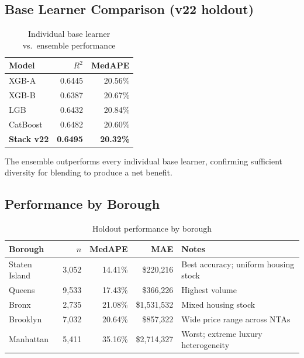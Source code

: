 \documentclass[11pt, a4paper, twoside]{article}
\begin{document}
\subsection{Base Learner Comparison (v22 holdout)}
\begin{table}[H]
  \centering
  \caption{Individual base learner vs.\ ensemble performance}
  \label{tab:base_perf}
  \begin{tabular}{lrr}
    \toprule
    Model & $R^2$ & MedAPE \\
    \midrule
    XGB-A    & 0.6445 & 20.56\% \\
    XGB-B    & 0.6387 & 20.67\% \\
    LGB      & 0.6432 & 20.84\% \\
    CatBoost & 0.6482 & 20.60\% \\
    \midrule
    \textbf{Stack v22} & \textbf{0.6495} & \textbf{20.32\%} \\
    \bottomrule
  \end{tabular}
\end{table}
The ensemble outperforms every individual base learner, confirming sufficient
diversity for blending to produce a net benefit.

\subsection{Performance by Borough}
\begin{table}[H]
  \centering
  \caption{Holdout performance by borough}
  \label{tab:borough_perf}
  \begin{tabular}{lrrrp{5.5cm}}
    \toprule
    Borough & $n$ & MedAPE & MAE & Notes \\
    \midrule
    Staten Island &  3,052 & 14.41\% & \$220,216 & Best accuracy; uniform housing stock \\
    Queens        &  9,533 & 17.43\% & \$366,226 & Highest volume \\
    Bronx         &  2,735 & 21.08\% & \$1,531,532 & Mixed housing stock \\
    Brooklyn      &  7,032 & 20.64\% & \$857,322 & Wide price range across NTAs \\
    Manhattan     &  5,411 & 35.16\% & \$2,714,327 & Worst; extreme luxury heterogeneity \\
    \bottomrule
  \end{tabular}
\end{table}
\end{document}
